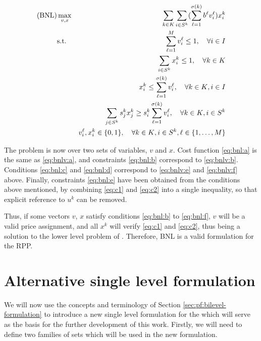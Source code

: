 {
    \newcommand{\sumk} { \sum_\kk }
    \newcommand{\sumi} { \sum_\is }
    \newcommand{\sumj} { \sum_{j\in S^k} }
    \newcommand{\suml} { \sum_{\ell=1}^{\sigma(k)} }
    \newcommand{\summ} { \sum_{\ell=1}^{M} }

    \begin{eqnarray}
        \rm{(BNL)}
        &\max_{v,x}  & \sumk\sumi(\suml b^\ell v_i^\ell) x_i^k                            \label{eq:bnl:a}\\
        &\text{s.t.} & \summ v_i^\ell \leq 1, \quad \forall\ii                            \label{eq:bnl:b}\\
        &            & \sumi x_i^k    \leq 1, \quad \forall\kk                            \label{eq:bnl:c}\\
        &            & x_i^k \leq \suml v_i^\ell, \quad \forall\kk, \ii                   \label{eq:bnl:d}\\
        &            & \sumj s_j^k x_j^k \geq s_i^k\suml v_i^\ell, \quad \forall\kk, \is  \label{eq:bnl:e}\\
        &            & v_i^\ell, x_i^k \in \binset, \quad \forall\kk, \is, \lm            \label{eq:bnl:f}
    \end{eqnarray}
}

The problem is now over two sets of variables, $v$ and $x$. Cost function
\eqref{eq:bnl:a} is the same as \eqref{eq:bnlv:a}, and constraints
\eqref{eq:bnl:b} correspond to \eqref{eq:bnlv:b}. Conditions \eqref{eq:bnl:c}
and \eqref{eq:bnl:d} correspond to \eqref{eq:bnlv:e} and \eqref{eq:bnlv:f}
above. Finally, constraints \eqref{eq:bnl:e} have been obtained from the
conditions above mentioned, by combining \eqref{eq:c1} and \eqref{eq:c2} into a
single inequality, so that explicit reference to $u^k$ can be removed.

Thus, if some vectors $v$, $x$ satisfy conditions \eqref{eq:bnl:b} to
\eqref{eq:bnl:f}, $v$ will be a valid price assignment, and all $x^k$ will
verify \eqref{eq:c1} and \eqref{eq:c2}, thus being a solution to the lower level
problem of \bnlp. Therefore, BNL is a valid formulation for the RPP.

\section{Alternative single level formulation} %
\label{sec:pf:alternative}

We will now use the concepts and terminology of Section
\ref{sec:pf:bilevel-formulation} to introduce a new single level formulation for
the \rpp which will serve as the basis for the further development of this work.
Firstly, we will need to define two families of sets which will be used in the
new formulation.

